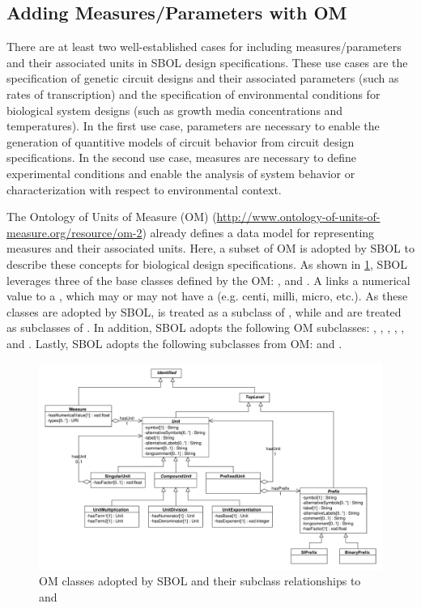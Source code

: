 \subsection{Adding Measures/Parameters with OM}
\label{sec:parameters}


There are at least two well-established cases for including measures/parameters and their associated units in SBOL design specifications. These use cases are the specification of genetic circuit designs and their associated parameters (such as rates of transcription) and the specification of environmental conditions for biological system designs (such as growth media concentrations and temperatures). In the first use case, parameters are necessary to enable the generation of quantitive models of circuit behavior from circuit design specifications. In the second use case, measures are necessary to define experimental conditions and enable the analysis of system behavior or characterization with respect to environmental context.

The Ontology of Units of Measure (OM) (\url{http://www.ontology-of-units-of-measure.org/resource/om-2}) already defines a data model for representing measures and their associated units. Here, a subset of OM is adopted by SBOL to describe these concepts for biological design specifications. As shown in \ref{uml:om}, SBOL leverages three of the base classes defined by the OM: ,  and . A  links a numerical value to a , which may or may not have a  (e.g. centi, milli, micro, etc.). As these classes are adopted by SBOL,  is treated as a subclass of , while  and  are treated as subclasses of . In addition, SBOL adopts the following OM  subclasses: , , , , , and . Lastly, SBOL adopts the following  subclasses from OM:  and .

\begin{figure}[ht]
\begin{center}
\includegraphics[width=\linewidth]{uml/om}
\caption[]{OM classes adopted by SBOL and their subclass relationships to  and }
\label{uml:om}
\end{center}
\end{figure}

